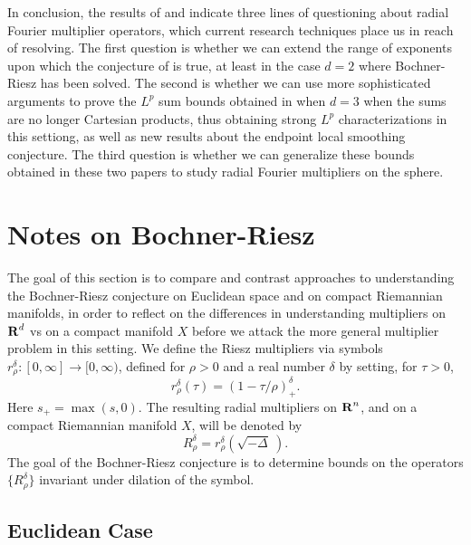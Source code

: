 In conclusion, the results of \cite{HeoandNazarovandSeeger} and \cite{Cladek} indicate three lines of questioning about radial Fourier multiplier operators, which current research techniques place us in reach of resolving. The first question is whether we can extend the range of exponents upon which the conjecture of \cite{GarrigosandSeeger} is true, at least in the case $d = 2$ where Bochner-Riesz has been solved. The second is whether we can use more sophisticated arguments to prove the $L^p$ sum bounds obtained in \cite{Cladek} when $d = 3$ when the sums are no longer Cartesian products, thus obtaining strong $L^p$ characterizations in this settiong, as well as new results about the endpoint local smoothing conjecture. The third question is whether we can generalize these bounds obtained in these two papers to study radial Fourier multipliers on the sphere. 

\chapter{Notes on Bochner-Riesz}

The goal of this section is to compare and contrast approaches to understanding the Bochner-Riesz conjecture on Euclidean space and on compact Riemannian manifolds, in order to reflect on the differences in understanding multipliers on $\operatorname{\mathbf{R}}^d$ vs on a compact manifold $X$ before we attack the more general multiplier problem in this setting. We define the Riesz multipliers via symbols $r_\rho^\delta: [0,\infty] \to [0,\infty)$, defined for $\rho > 0$ and a real number $\delta$ by setting, for $\tau > 0$,
%
\[ r_\rho^\delta(\tau) = (1 - \tau / \rho)_+^\delta. \]
%
Here $s_+ = \max(s,0)$. The resulting radial multipliers on $\operatorname{\mathbf{R}}^n$, and on a compact Riemannian manifold $X$, will be denoted by
%
\[ R_\rho^\delta = r_\rho^\delta \left( \sqrt{-\Delta}\ \right). \]
%
The goal of the Bochner-Riesz conjecture is to determine bounds on the operators $\{ R_\rho^\delta \}$ invariant under dilation of the symbol.

\section{Euclidean Case}

